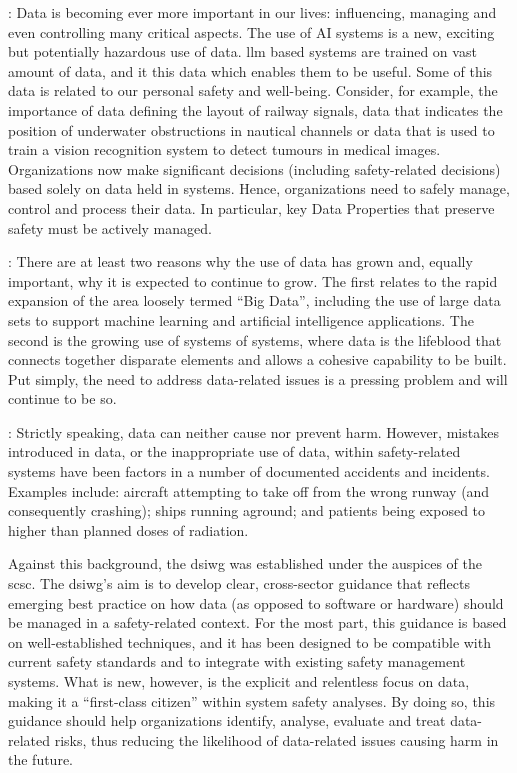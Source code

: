 :
Data is becoming ever more important in our lives: influencing, managing and even controlling many critical aspects.
The use of AI systems is a new, exciting but potentially hazardous use of data. \acrfull{llm} based systems are trained on vast amount of data, and it this data which enables them to be useful.
Some of this data is related to our personal safety and well-being.
Consider, for example, the importance of data defining the layout of railway signals,
data that indicates the position of underwater obstructions in nautical channels or data that
is used to train a vision recognition system to detect tumours in medical images.
Organizations now make significant decisions (including safety-related decisions) based solely on data held in systems.
Hence, organizations need to safely manage, control and process their data.
In particular, key Data Properties that preserve safety must be actively managed.

: There are at least two reasons why the use of data has grown and, equally important, why it is expected to continue to grow. The  first relates to the rapid expansion of the area loosely termed ``Big Data'', including the use of large data sets to support machine learning and artificial intelligence applications. The second is the growing use of systems of systems, where data is the lifeblood that connects together disparate elements and allows a cohesive capability to be built. Put simply, the need to address data-related issues is a pressing problem and will continue to be so.

: Strictly speaking,
data can neither cause nor prevent harm.
However, mistakes introduced in data, or the inappropriate use of data, within safety-related systems have been factors in a number of documented accidents and incidents. Examples include: aircraft attempting to take off from the wrong runway (and consequently crashing); ships running aground; and patients being exposed to higher than planned doses of radiation.

Against this background, the \gls{dsiwg} was established under the auspices of the \gls{scsc}. The \gls{dsiwg}'s aim is to develop clear, cross-sector guidance that reflects emerging best practice on how data (as opposed to software or hardware) should be managed in a safety-related context.
For the most part, this guidance is based on well-established techniques,
and it has been designed to be compatible with current safety standards and to integrate with existing safety management systems.
What is new, however, is the explicit and relentless focus on data, making it a ``first-class citizen'' within system safety analyses.
By doing so, this guidance should help organizations identify, analyse, evaluate and treat data-related risks, thus reducing the likelihood of data-related issues causing harm in the future.

